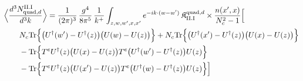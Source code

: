 \begingroup\small
\begin{align}\label{eq:S-II.I-2d}
&\Big\langle\frac{d^{3}N^{\rm II.I}_{{\rm quad},d}}{d^{3}k}\Big\rangle=\frac{1}{(2\pi)^{3}}\, \frac{g^{4}}{8\pi^{5}}\, \frac{1}{k^{+}} \int_{z,w,w',x,x'}e^{-ik\cdot(w-w')}\, \mathfrak{K}^{{\rm quad},d}_{\rm II.I} \times\frac{n(x',x)}{N_{c}^{2}-1}\Big[\notag\\
&\quad\quad N_{c}{\rm Tr}\Big\{\big(U^{\dagger}(w')-U^{\dagger}(z)\big)\big(U(w)-U(z)\big)\Big\} +N_{c}{\rm Tr}\Big\{\big(U^{\dagger}(x')-U^{\dagger}(z)\big)\big(U(x)-U(z)\big)\Big\}\notag\\
&\quad\quad -{\rm Tr}\Big\{T^{e}U^{\dagger}(z)\big(U(x)-U(z)\big)T^{e}\big(U^{\dagger}(w')-U^{\dagger}(z)\big)U(z)\Big\}\notag\\
&\quad\quad -{\rm Tr}\Big\{T^{e}U^{\dagger}(z)\big(U(x')-U(z)\big)T^{e}\big(U^{\dagger}(w)-U^{\dagger}(z)\big)U(z)\Big\}\Big]
\end{align}
\endgroup
